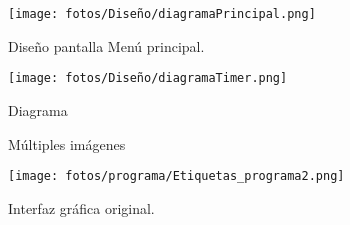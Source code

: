 \begin{figure}[H]
\label{Diagrama_original}
\begin{minipage}[b]{0.47\linewidth}
\centering
\texttt{[image: fotos/Diseño/diagramaPrincipal.png]}
\caption{Diseño pantalla  Menú principal.}
\label{diagrama_prinicpal_original}
\end{minipage}
\hspace{0.5 cm}
\begin{minipage}[b]{0.47\linewidth}
    \centering
    \texttt{[image: fotos/Diseño/diagramaTimer.png]}
    \caption{Diagrama}
    \label{dis_calculoModelo}
\end{minipage}
\end{figure}


\begin{figure}
    \centering
        \caption{Múltiples imágenes}\label{f:animales}
\end{figure}


\begin{figure}[H]
    \centering
    \texttt{[image: fotos/programa/Etiquetas\_programa2.png]}
    \caption{Interfaz gráfica original.}
    \label{diagrama_timer_original}
\end{figure}


